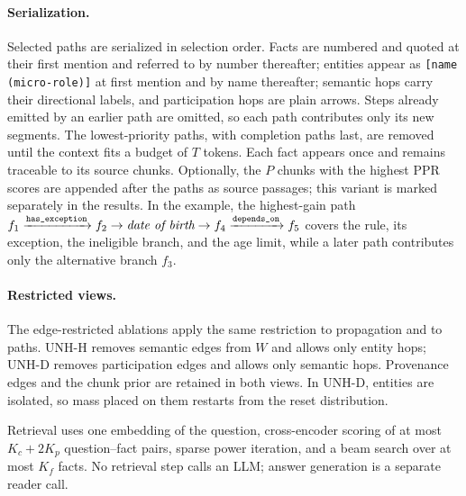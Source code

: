 \paragraph{Serialization.}
Selected paths are serialized in selection order. Facts are numbered and
quoted at their first mention and referred to by number thereafter; entities
appear as \texttt{[name (micro-role)]} at first mention and by name thereafter;
semantic hops carry their directional labels, and participation hops are
plain arrows. Steps already emitted by an earlier path are omitted, so each
path contributes only its new segments. The lowest-priority paths, with
completion paths last, are removed until the context fits a budget of $T$
tokens. Each fact appears once and remains traceable to its source chunks.
Optionally, the $P$ chunks with the highest PPR scores are appended
after the paths as source passages; this variant is marked separately in the
results. In the example, the highest-gain path
$f_1\xrightarrow{\texttt{has\_exception}}f_2\rightarrow\emph{date of birth}
\rightarrow f_4\xrightarrow{\texttt{depends\_on}}f_5$
covers the rule, its exception, the ineligible branch, and the age limit,
while a later path contributes only the alternative branch $f_3$.

\paragraph{Restricted views.}
The edge-restricted ablations apply the same restriction to propagation and
to paths. UNH-H removes semantic edges from $W$ and allows only entity hops;
UNH-D removes participation edges and allows only semantic hops. Provenance
edges and the chunk prior are retained in both views. In UNH-D, entities are
isolated, so mass placed on them restarts from the reset distribution.

Retrieval uses one embedding of the question, cross-encoder scoring of at
most $K_c+2K_p$ question--fact pairs, sparse power iteration, and a beam
search over at most $K_f$ facts. No retrieval step calls an LLM; answer generation
is a separate reader call.


